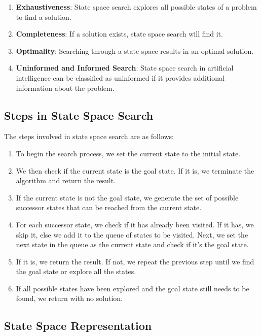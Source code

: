 \documentclass[11pt]{article}
\begin{document}
\begin{enumerate}
    \item \textbf{Exhaustiveness}:
          State space search explores all possible states of a problem to find a solution.
    \item \textbf{Completeness}:
          If a solution exists, state space search will find it.
    \item \textbf{Optimality}:
          Searching through a state space results in an optimal solution.
    \item \textbf{Uninformed and Informed           Search}:
          State space search in artificial intelligence can be classified as uninformed if it provides
          additional information about the problem.
\end{enumerate}

\subsection{Steps in State Space Search}

The steps involved in state space search are as follows:

\begin{enumerate}
    \item To begin the search process, we set the current state to the initial state.
    \item We then check if the current state is the goal state. If it is, we terminate the algorithm and
          return the result.
    \item If the current state is not the goal state, we generate the set of possible successor states
          that can be reached from the current state.
    \item For each successor state, we check if it has already been visited. If it has, we skip it, else
          we add it to the queue of states to be visited.
          Next, we set the next state in the queue as the current state and check if it's the goal state.
    \item If it is, we return the result. If not, we repeat the previous step until we find the goal state
          or explore all the states.
    \item If all possible states have been explored and the goal state still needs to be found, we
          return with no solution.
\end{enumerate}

\subsection{State Space Representation}
\end{document}

